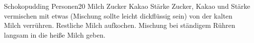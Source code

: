 \begin{MyRecipe}{Schokopudding}{ Personen}{\SI{20}{\minuteprime}}
	\ingredient[\Calc{0.5}{\x}]{\si{\liter}} {Milch}
	\ingredient[\Calc{60}{\x}]{\si{\gram}} {Zucker}
	\ingredient[\Calc{50}{\x}]{\si{\gram}} {Kakao}
	\ingredient[\Calc{35}{\x}]{\si{\gram}} {Stärke}
	Zucker, Kakao und Stärke vermischen mit etwas (Mischung sollte leicht dickflüssig sein) von der kalten Milch verrühren. Restliche Milch aufkochen. Mischung bei ständigem Rühren langsam in die heiße Milch geben.\par\bigskip
\end{MyRecipe}